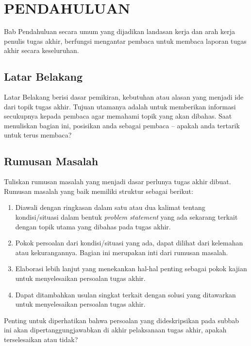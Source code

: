 \chapter{PENDAHULUAN}
\label{chap:pendahuluan}
\begin{petunjuk}
Bab Pendahuluan secara umum yang dijadikan landasan kerja dan arah kerja penulis tugas akhir, berfungsi mengantar pembaca untuk membaca laporan tugas akhir secara keseluruhan.
\end{petunjuk}

\section{Latar Belakang}
\begin{petunjuk}
Latar Belakang berisi dasar pemikiran, kebutuhan atau alasan yang menjadi ide dari topik tugas akhir. Tujuan utamanya adalah untuk memberikan informasi secukupnya kepada pembaca agar memahami topik yang akan dibahas. Saat menuliskan bagian ini, posisikan anda sebagai pembaca -- apakah anda tertarik untuk terus membaca?
\end{petunjuk}

\section{Rumusan Masalah}
\begin{petunjuk}
Tuliskan rumusan masalah yang menjadi dasar perlunya tugas akhir dibuat. Rumusan masalah yang baik memiliki struktur sebagai berikut:
\begin{enumerate}
  \item Diawali dengan ringkasan dalam satu atau dua kalimat tentang kondisi/situasi dalam bentuk \textit{problem statement} yang ada sekarang terkait dengan topik utama yang dibahas pada tugas akhir.
  \item Pokok persoalan dari kondisi/situasi yang ada, dapat dilihat dari kelemahan atau kekurangannya. Bagian ini merupakan inti dari rumusan masalah.
  \item Elaborasi lebih lanjut yang menekankan hal-hal penting sebagai pokok kajian untuk menyelesaikan persoalan tugas akhir.
  \item Dapat ditambahkan usulan singkat terkait dengan solusi yang ditawarkan untuk menyelesaikan persoalan tugas akhir.
\end{enumerate}
Penting untuk diperhatikan bahwa persoalan yang dideskripsikan pada subbab ini akan dipertanggungjawabkan di akhir pelaksanaan tugas akhir, apakah terselesaikan atau tidak?
\end{petunjuk}

